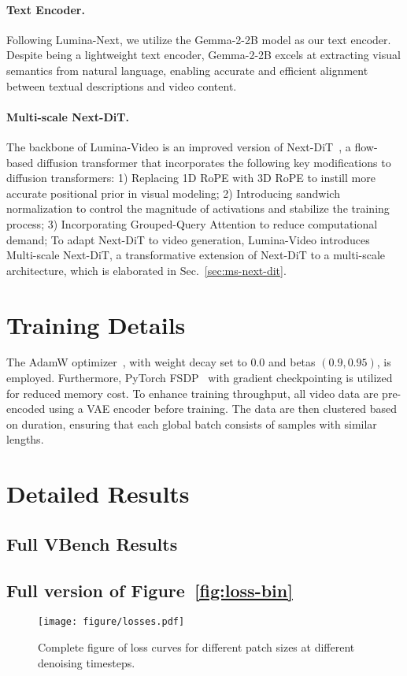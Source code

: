 \paragraph{Text Encoder.} 
Following Lumina-Next, we utilize the Gemma-2-2B model \cite{team2024gemma} as our text encoder. Despite being a lightweight text encoder, Gemma-2-2B excels at extracting visual semantics from natural language, enabling accurate and efficient alignment between textual descriptions and video content. 

\paragraph{Multi-scale Next-DiT.} The backbone of Lumina-Video is an improved version of Next-DiT~\citep{luminanext}, a flow-based diffusion transformer that incorporates the following key modifications to diffusion transformers: 
1) Replacing 1D RoPE with 3D RoPE to instill more accurate positional prior in visual modeling;
2) Introducing sandwich normalization to control the magnitude of activations and stabilize the training process;
3) Incorporating Grouped-Query Attention to reduce computational demand;
To adapt Next-DiT to video generation, Lumina-Video introduces Multi-scale Next-DiT, a transformative extension of Next-DiT to a multi-scale architecture, which is elaborated in Sec.~\ref{sec:ms-next-dit}.

\section{Training Details}
The AdamW optimizer~\citep{adamw}, with weight decay set to \(0.0\) and betas \((0.9, 0.95)\), is employed. Furthermore, PyTorch FSDP~\citep{fsdp} with gradient checkpointing is utilized for reduced memory cost. To enhance training throughput, all video data are pre-encoded using a VAE encoder before training. The data are then clustered based on duration, ensuring that each global batch consists of samples with similar lengths.

\newpage
\section{Detailed Results}
\subsection{Full VBench Results}

\newpage
\subsection{Full version of Figure~\ref{fig:loss-bin}}
\label{sec:full-loss-bin}
\begin{figure*}[h]
    \centering
    \texttt{[image: figure/losses.pdf]}
    \vspace{-1.5em}
    \caption{Complete figure of loss curves for different patch sizes at different denoising timesteps.}
    \vspace{-1em}
    \label{fig:loss-bin-complete}
\end{figure*}

